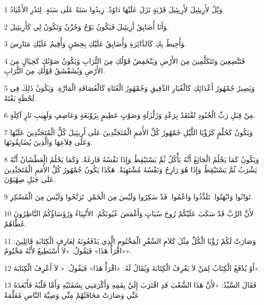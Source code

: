 \par 1 وَيْلٌ لأَرِيئِيلَ لأَرِيئِيلَ قَرْيَةٍ نَزَلَ عَلَيْهَا دَاوُدُ. زِيدُوا سَنَةً عَلَى سَنَةٍ. لِتَدُرِ الأَعْيَادُ.
\par 2 وَأَنَا أُضَايِقُ أَرِيئِيلَ فَيَكُونُ نَوْحٌ وَحُزْنٌ وَتَكُونُ لِي كَأَرِيئِيلَ.
\par 3 وَأُحِيطُ بِكِ كَالدَّائِرَةِ وَأُضَايِقُ عَلَيْكِ بِحِصْنٍ وَأُقِيمُ عَلَيْكِ مَتَارِسَ.
\par 4 فَتَتَّضِعِينَ وَتَتَكَلَّمِينَ مِنَ الأَرْضِ وَيَنْخَفِضُ قَوْلُكِ مِنَ التُّرَابِ وَيَكُونُ صَوْتُكِ كَخِيَالٍ مِنَ الأَرْضِ وَيُشَقْشَقُ قَوْلُكِ مِنَ التُّرَابِ.
\par 5 وَيَصِيرُ جُمْهُورُ أَعْدَائِكِ كَالْغُبَارِ الدَّقِيقِ وَجُمْهُورُ الْعُتَاةِ كَالْعُصَافَةِ الْمَارَّةِ. وَيَكُونُ ذَلِكَ فِي لَحْظَةٍ بَغْتَةً.
\par 6 مِنْ قِبَلِ رَبِّ الْجُنُودِ تُفْتَقَدُ بِرَعْدٍ وَزَلْزَلَةٍ وَصَوْتٍ عَظِيمٍ بِزَوْبَعَةٍ وَعَاصِفٍ وَلَهِيبِ نَارٍ آكِلَةٍ.
\par 7 وَيَكُونُ كَحُلْمٍ كَرُؤْيَا اللَّيْلِ جُمْهُورُ كُلِّ الأُمَمِ الْمُتَجَنِّدِينَ عَلَى أَرِيئِيلَ كُلُّ الْمُتَجَنِّدِينَ عَلَيْهَا وَعَلَى قِلاَعِهَا وَالَّذِينَ يُضَايِقُونَهَا.
\par 8 وَيَكُونُ كَمَا يَحْلُمُ الْجَائِعُ أَنَّهُ يَأْكُلُ ثُمَّ يَسْتَيْقِظُ وَإِذَا نَفْسُهُ فَارِغَةٌ. وَكَمَا يَحْلُمُ الْعَطْشَانُ أَنَّهُ يَشْرَبُ ثُمَّ يَسْتَيْقِظُ وَإِذَا هُوَ رَازِحٌ وَنَفْسُهُ مُشْتَهِيَةٌ. هَكَذَا يَكُونُ جُمْهُورُ كُلِّ الأُمَمِ الْمُتَجَنِّدِينَ عَلَى جَبَلِ صِهْيَوْنَ.
\par 9 تَوَانُوا وَابْهَتُوا. تَلَذَّذُوا وَاعْمُوا. قَدْ سَكِرُوا وَلَيْسَ مِنَ الْخَمْرِ. تَرَنَّحُوا وَلَيْسَ مِنَ الْمُسْكِرِ.
\par 10 لأَنَّ الرَّبَّ قَدْ سَكَبَ عَلَيْكُمْ رُوحَ سُبَاتٍ وَأَغْمَضَ عُيُونَكُمُ. الأَنْبِيَاءُ وَرُؤَسَاؤُكُمُ النَّاظِرُونَ غَطَّاهُمْ.
\par 11 وَصَارَتْ لَكُمْ رُؤْيَا الْكُلِّ مِثْلَ كَلاَمِ السِّفْرِ الْمَخْتُومِ الَّذِي يَدْفَعُونَهُ لِعَارِفِ الْكِتَابَةِ قَائِلِينَ: «اقْرَأْ هَذَا» فَيَقُولُ: «لاَ أَسْتَطِيعُ لأَنَّهُ مَخْتُومٌ».
\par 12 أَوْ يُدْفَعُ الْكِتَابُ لِمَنْ لاَ يَعْرِفُ الْكِتَابَةَ وَيُقَالُ لَهُ: «اقْرَأْ هَذَا» فَيَقُولُ: « لاَ أَعْرِفُ الْكِتَابَةَ».
\par 13 فَقَالَ السَّيِّدُ: «لأَنَّ هَذَا الشَّعْبَ قَدِ اقْتَرَبَ إِلَيَّ بِفَمِهِ وَأَكْرَمَنِي بِشَفَتَيْهِ وَأَمَّا قَلْبُهُ فَأَبْعَدَهُ عَنِّي وَصَارَتْ مَخَافَتُهُمْ مِنِّي وَصِيَّةَ النَّاسِ مُعَلَّمَةً
